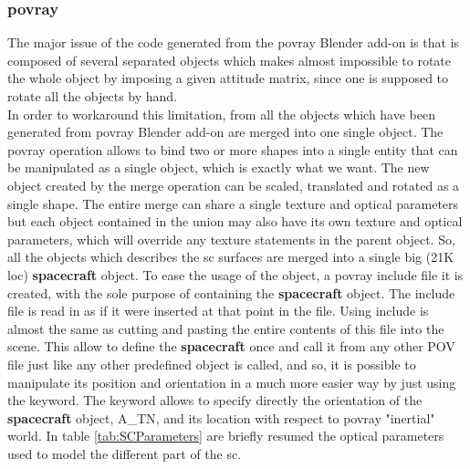 \subsubsection{\acrshort{povray}}
The major issue of the code generated from the  \acrshort{povray} Blender add-on is that is composed of several separated  objects which makes almost impossible to rotate the whole object by imposing a given attitude matrix, since one is supposed to rotate all the  objects by hand.\\
In order to workaround this limitation, from all the  objects which have been generated from \acrshort{povray} Blender add-on are merged into one single  object.
The  \acrshort{povray} operation allows to bind two or more shapes into a single entity that can be manipulated as a single object, which is exactly what we want. The new object created by the merge operation can be scaled, translated and rotated as a single shape. The entire merge can share a single texture and optical parameters but each object contained in the union may also have its own texture and optical parameters, which will override any texture statements in the parent object. So, all the  objects which describes the \acrshort{sc} surfaces are merged into a single big (21K \acrshort{loc}) \textbf{spacecraft}  object.
To ease the usage of the  object, a \acrshort{povray} include file it is created, with the sole purpose of containing the \textbf{spacecraft}  object.
The include file is read in as if it were inserted at that point in the file. Using include is almost the same as cutting and pasting the entire contents of this file into the scene. This allow to define the \textbf{spacecraft}  once and call it from any other POV file just like any other predefined object is called, and so, it is possible to manipulate its position and orientation in a much more easier way by just using the  keyword. The  keyword  allows to specify directly the orientation of the \textbf{spacecraft} object, \gls{A_TN}, and its location with respect to \acrshort{povray} "inertial" world.
In table \ref{tab:SCParameters} are briefly resumed the optical parameters used to model the different part of the \acrshort{sc}.


